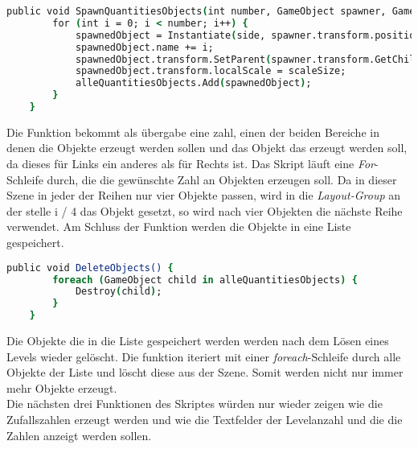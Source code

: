 \begin{lstlisting}[language=csh, caption={GameQuantities.cs SpawnQuantitiesObjects Funktion}]
	public void SpawnQuantitiesObjects(int number, GameObject spawner, GameObject side) {
		for (int i = 0; i < number; i++) {
			spawnedObject = Instantiate(side, spawner.transform.position, Quaternion.identity);
			spawnedObject.name += i;
			spawnedObject.transform.SetParent(spawner.transform.GetChild(i / 4));
			spawnedObject.transform.localScale = scaleSize;
			alleQuantitiesObjects.Add(spawnedObject);
		}
	}
\end{lstlisting}
Die Funktion bekommt als übergabe eine zahl, einen der beiden Bereiche in denen die Objekte erzeugt werden sollen und das Objekt das erzeugt werden soll, da dieses für Links ein anderes als für Rechts ist. Das Skript läuft eine \textit{For}-Schleife durch, die die gewünschte Zahl an Objekten erzeugen soll. Da in dieser Szene in jeder der Reihen nur vier Objekte passen, wird in die \textit{Layout-Group} an der stelle i / 4 das Objekt gesetzt, so wird nach vier Objekten die nächste Reihe verwendet. Am Schluss der Funktion werden die Objekte in eine Liste gespeichert.\\
\begin{lstlisting}[language=csh, caption={GameQuantities.cs Delete Funktion}]
	public void DeleteObjects() {
		foreach (GameObject child in alleQuantitiesObjects) {
			Destroy(child);
		}
	}
\end{lstlisting}
Die Objekte die in die Liste gespeichert werden werden nach dem Lösen eines Levels wieder gelöscht. Die funktion iteriert mit einer \textit{foreach}-Schleife durch alle Objekte der Liste und löscht diese aus der Szene. Somit werden nicht nur immer mehr Objekte erzeugt.\\

Die nächsten drei Funktionen des Skriptes würden nur wieder zeigen wie die Zufallszahlen erzeugt werden und wie die Textfelder der Levelanzahl und die die Zahlen anzeigt werden sollen.\\

